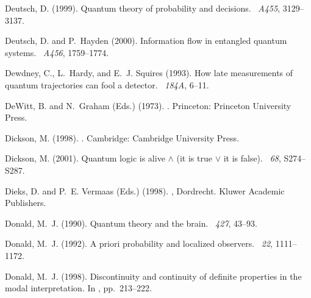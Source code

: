 \documentclass[12pt]{article}
\begin{document}
\begin{thebibliography}{}
Deutsch, D. (1999).
\newblock Quantum theory of probability and decisions.
~{\em A455},
  3129--3137.

Deutsch, D. and P.~Hayden (2000).
\newblock Information flow in entangled quantum systems.
~{\em A456},
  1759--1774.

Dewdney, C., L.~Hardy, and E.~J. Squires (1993).
\newblock How late measurements of quantum trajectories can fool a detector.
~{\em 184A}, 6--11.

DeWitt, B. and N.~Graham (Eds.) (1973).
.
\newblock Princeton: Princeton University Press.

Dickson, M. (1998).
.
\newblock Cambridge: Cambridge University Press.

Dickson, M. (2001).
\newblock Quantum logic is alive $\wedge$ (it is true $\vee$ it is false).
~{\em 68}, S274--S287.

Dieks, D. and P.~E. Vermaas (Eds.) (1998).
, Dordrecht.
  Kluwer Academic Publishers.

Donald, M.~J. (1990).
\newblock Quantum theory and the brain.
~{\em 427},
  43--93.

Donald, M.~J. (1992).
\newblock A priori probability and localized observers.
~{\em 22}, 1111--1172.

Donald, M.~J. (1998).
\newblock Discontinuity and continuity of definite properties in the modal
  interpretation.
\newblock In , pp.\  213--222.


\end{thebibliography}
\end{document}
